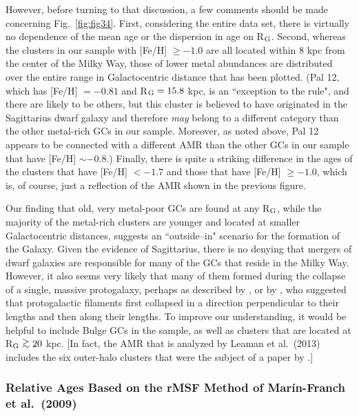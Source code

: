 \documentclass[12pt,preprint]{aastex}
\newcommand\gta{\mathrel{\hbox{\raise 0.6 ex \hbox{$>$}\kern
                   -1.7 ex\lower .5 ex\hbox{$\sim$}}}}
\begin{document}
However, before turning to that discussion, a few comments should be made 
concerning Fig.~\ref{fig:fig34}.  First, considering the entire data set, there
is virtually no dependence of the mean age or the dispersion in age on R$_{\rm
G}$.  Second, whereas the clusters in our sample with [Fe/H] $\ge -1.0$ are all
located within 8 kpc from the center of the Milky Way, those of lower metal
abundances are distributed over the entire range in Galactocentric distance
that has been plotted.  (Pal 12, which has [Fe/H] $= -0.81$ and R$_{\rm G} =
15.8$ kpc, is an ``exception to the rule", and there are likely to be others,
but this cluster is believed to have originated in the Sagittarius dwarf galaxy
and therefore {\it may} belong to a different category than the other metal-rich
GCs in our sample.  Moreover, as noted above, Pal 12 appears to be connected
with a different AMR than the other GCs in our sample that have [Fe/H] $\sim
-0.8$.)  Finally, there is quite a striking difference in the ages of the
clusters that have [Fe/H] $< -1.7$ and those that have [Fe/H] $\ge -1.0$, which
is, of course, just a reflection of the AMR shown in the previous figure.

Our finding that old, very metal-poor GCs are found at any R$_{\rm G}$, while
the majority of the metal-rich clusters are younger and located at smaller
Galactocentric distances, suggests an ``outside--in" scenario for the formation
of the Galaxy.  Given the evidence of Sagittarius, there is no denying that
mergers of dwarf galaxies are responsible for many of the GCs that reside in the
Milky Way.  However, it also seems very likely that many of them formed during
the collapse of a single, massive protogalaxy, perhaps as described by
\citet[also see \citealt{san90b}]{els62}, or by \citet{har09}, who suggested
that protogalactic filaments first collapsed in a direction perpendicular to
their lengths and then along their lengths.  To improve our understanding, it 
would be helpful to include Bulge GCs in the sample, as well as clusters that 
are located at R$_{\rm G} \gta 20$ kpc. [In fact, the AMR that is analyzed by
Leaman et al.~(2013) includes the six outer-halo clusters that were the 
subject of a paper by \citet{dsa11}.]

\subsubsection{Relative Ages Based on the rMSF Method of Mar\'in-Franch et
al.~(2009)}
\label{subsubsec:mf09}
\end{document}
